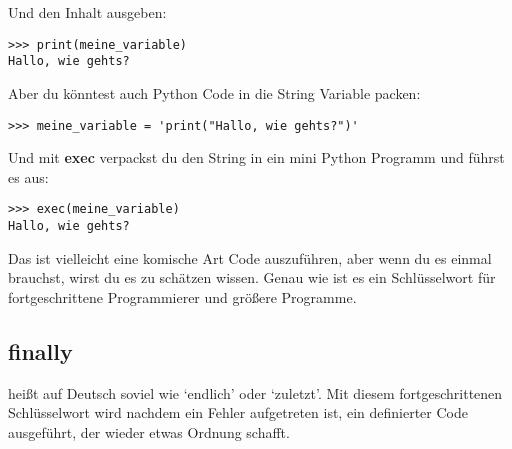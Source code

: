 \noindent
Und den Inhalt ausgeben:

\begin{Verbatim}[frame=single]
>>> print(meine_variable)
Hallo, wie gehts?
\end{Verbatim}

\noindent
Aber du könntest auch Python Code in die String Variable packen:

\begin{Verbatim}[frame=single]
>>> meine_variable = 'print("Hallo, wie gehts?")'
\end{Verbatim}

\noindent
Und mit \textbf{exec} verpackst du den String in ein mini Python Programm und führst es aus:

\begin{Verbatim}[frame=single]
>>> exec(meine_variable)
Hallo, wie gehts?
\end{Verbatim}

Das ist vielleicht eine komische Art Code auszuführen, aber wenn du es einmal brauchst, wirst du es zu schätzen wissen. Genau wie  ist es ein Schlüsselwort für fortgeschrittene Programmierer und größere Programme.

\subsection*{finally}

 heißt auf Deutsch soviel wie `endlich' oder `zuletzt'. Mit diesem fortgeschrittenen Schlüsselwort wird nachdem ein Fehler aufgetreten ist, ein definierter Code ausgeführt, der wieder etwas Ordnung schafft.

